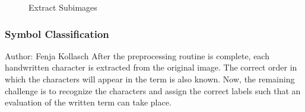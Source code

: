 \documentclass[12pt]{article}
\begin{document}
\begin{figure}[h!]
	\centering
	\quad
	
	\caption{Extract Subimages}
\end{figure}
\subsubsection{Symbol Classification}
\small{Author: Fenja Kollasch} \newline \newline
After the preprocessing routine is complete, each handwritten character is extracted from the original image. The correct order in which the characters will appear in the term is also known. Now, the remaining challenge is to recognize the characters and assign the correct labels such that an evaluation of the written term can take place.
	
\end{document}
